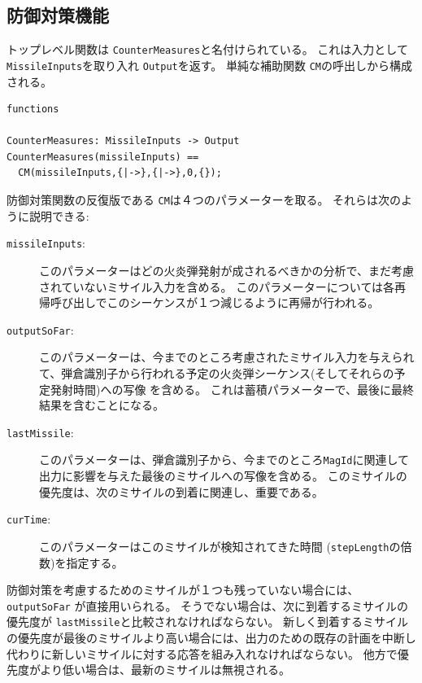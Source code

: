 \documentclass[\pformat,12pt]{jreport}
\begin{document}
\subsection{防御対策機能}

トップレベル関数は \texttt{CounterMeasures}と名付けられている。 
これは入力として\texttt{MissileInputs}を取り入れ \texttt{Output}を返す。 
単純な補助関数 \texttt{CM}の呼出しから構成される。

\begin{lstlisting}
functions

CounterMeasures: MissileInputs -> Output
CounterMeasures(missileInputs) ==
  CM(missileInputs,{|->},{|->},0,{});
\end{lstlisting}

防御対策関数の反復版である \texttt{CM}は４つのパラメーターを取る。
それらは次のように説明できる:

\begin{description}
\item[\texttt{missileInputs}:] このパラメーターはどの火炎弾発射が成されるべきかの分析で、まだ考慮されていないミサイル入力を含める。
このパラメーターについては各再帰呼び出しでこのシーケンスが１つ減じるように再帰が行われる。
\item[\texttt{outputSoFar}:] このパラメーターは、今までのところ考慮されたミサイル入力を与えられて、弾倉識別子から行われる予定の火炎弾シーケンス(そしてそれらの予定発射時間)への写像 を含める。
これは蓄積パラメーターで、最後に最終結果を含むことになる。
\item[\texttt{lastMissile}:] このパラメーターは、弾倉識別子から、今までのところ\texttt{MagId}に関連して出力に影響を与えた最後のミサイルへの写像を含める。
このミサイルの優先度は、次のミサイルの到着に関連し、重要である。
\item[\texttt{curTime}:] このパラメーターはこのミサイルが検知されてきた時間 (\texttt{stepLength}の倍数)を指定する。
\end{description}

防御対策を考慮するためのミサイルが１つも残っていない場合には、\texttt{outputSoFar} が直接用いられる。
そうでない場合は、次に到着するミサイルの優先度が \texttt{lastMissile}と比較されなければならない。
新しく到着するミサイルの優先度が最後のミサイルより高い場合には、出力のための既存の計画を中断し代わりに新しいミサイルに対する応答を組み入れなければならない。
他方で優先度がより低い場合は、最新のミサイルは無視される。
\newpage
\end{document}
